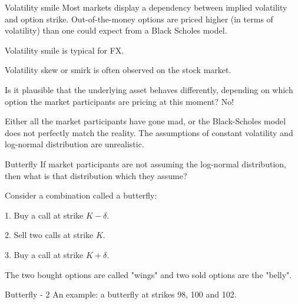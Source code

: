 \documentclass{beamer}
\begin{document}
\begin{frame}{Volatility smile}
\justify
Most markets display a dependency between implied volatility and option strike. Out-of-the-money options are priced higher (in terms of volatility) than one could expect from a Black Scholes model.

\justify
Volatility \alert{smile} is typical for FX.

\justify
Volatility \alert{skew} or \alert{smirk} is often observed on the stock market.

\justify
Is it plausible that the underlying asset behaves differently, depending on which option the market participants are pricing at this moment? No!

\justify
Either all the market participants have gone mad, or the Black-Scholes model does not perfectly match the reality. The assumptions of constant volatility and log-normal distribution are unrealistic.
\end{frame}



\begin{frame}{Butterfly}
\justify
If market participants are not assuming the log-normal distribution, then what is that distribution which they assume?

\justify
Consider a combination called a \alert{butterfly}:

1. Buy a call at strike $K - \delta$.

2. Sell two calls at strike $K$.

3. Buy a call at strike $K + \delta$.

\justify
The two bought options are called "wings" and two sold options are the "belly".
\end{frame}



\begin{frame}{Butterfly - 2}
\justify
An example: a butterfly at strikes 98, 100 and 102.

\centering
\end{frame}
\end{document}
